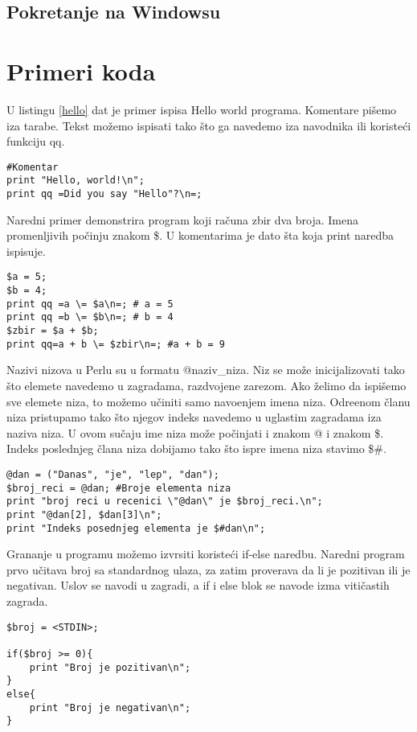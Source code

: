 \documentclass[a4paper]{article}
\begin{document}
\subsection{Pokretanje na Windowsu}

\section{Primeri koda}
U listingu \ref{hello} dat je primer ispisa Hello world programa. Komentare pi\v semo iza tarabe. Tekst mo\v zemo ispisati tako \v sto ga navedemo iza navodnika ili koriste\'ci funkciju qq.
\begin{lstlisting}[caption={Primer Hello world programa},frame=single, label=hello]
#Komentar
print "Hello, world!\n";
print qq =Did you say "Hello"?\n=;
\end{lstlisting}

Naredni primer demonstrira program koji ra\v cuna zbir dva broja. Imena promenljivih po\v cinju znakom \$. U komentarima je dato \v sta koja print naredba ispisuje.
\begin{lstlisting}[caption={Zbir dva broja}, frame=single, label = zbir]
$a = 5;
$b = 4;
print qq =a \= $a\n=; # a = 5
print qq =b \= $b\n=; # b = 4
$zbir = $a + $b;
print qq=a + b \= $zbir\n=; #a + b = 9
\end{lstlisting}

Nazivi nizova u Perlu su u formatu @naziv\_niza. Niz se mo\v ze inicijalizovati tako \v sto elemete navedemo u zagradama, razdvojene zarezom. Ako \v zelimo da ispi\v semo sve elemete niza, to mo\v zemo u\v ciniti samo navo\dj{}enjem imena niza. Odre\dj{}enom \v clanu niza pristupamo tako \v sto njegov indeks navedemo u uglastim zagradama iza naziva niza. U ovom su\v caju ime niza mo\v ze po\v cinjati i znakom @ i znakom \$. Indeks poslednjeg \v clana niza dobijamo tako \v sto ispre imena niza stavimo \$\#.
\begin{lstlisting}[caption={Niz}, frame=single, label=niz]
@dan = ("Danas", "je", "lep", "dan"); 
$broj_reci = @dan; #Broje elementa niza
print "broj reci u recenici \"@dan\" je $broj_reci.\n";
print "@dan[2], $dan[3]\n";
print "Indeks posednjeg elementa je $#dan\n";
\end{lstlisting}
Grananje u programu mo\v zemo izvrsiti koriste\'ci if-else naredbu. Naredni program prvo u\v citava broj sa standardnog ulaza, za zatim proverava da li je pozitivan ili je negativan. Uslov se navodi u zagradi, a if i else blok se navode izma\dj{} viti\v castih zagrada.
\begin{lstlisting}[caption={If-else naredba}, frame=single, label=ifelse]
$broj = <STDIN>;

if($broj >= 0){
    print "Broj je pozitivan\n";
}
else{
    print "Broj je negativan\n";
}
\end{lstlisting}
\end{document}
